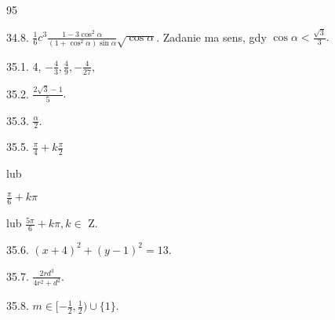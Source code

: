 \documentclass[a4paper,12pt]{article}
\begin{document}
95

34.8. $\displaystyle \frac{1}{6}c^{3}\frac{1-3\cos^{2}\alpha}{(1+\cos^{2}\alpha)\sin\alpha}\sqrt{\cos\alpha}$. Zadanie ma sens, gdy $\displaystyle \cos\alpha<\frac{\sqrt{3}}{3}.$

35.1. 4, $-\displaystyle \frac{4}{3}, \displaystyle \frac{4}{9}, -\displaystyle \frac{4}{27},$

35.2. $\displaystyle \frac{2\sqrt{3}-1}{5}.$

35.3. $\displaystyle \frac{\alpha}{2}.$

35.5. $\displaystyle \frac{\pi}{4}+k\frac{\pi}{2}$

lub

$\displaystyle \frac{\pi}{6}+k\pi$

lub $\displaystyle \frac{5\pi}{6}+k\pi,  k\in$ Z.

35.6. $(x+4)^{2}+(y-1)^{2}=13.$

35.7. $\displaystyle \frac{2rd^{3}}{4r^{2}+d^{2}}.$

35.8. $ m\in [-\displaystyle \frac{1}{2},\frac{1}{2})\cup\{1\}.$
\end{document}
